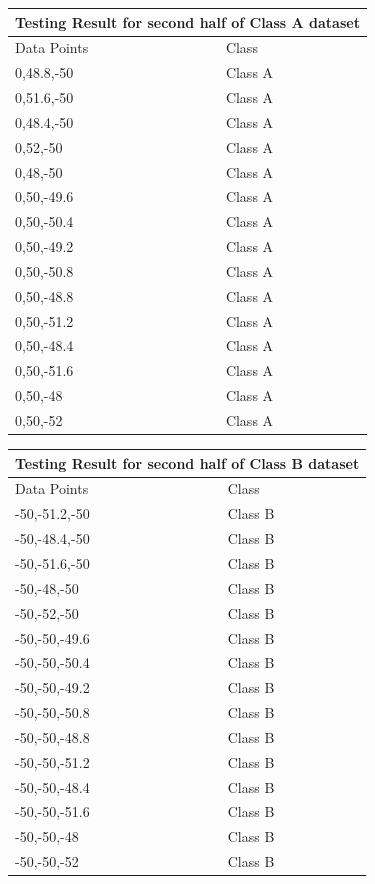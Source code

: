 \documentclass[letterpaper]{article}
\begin{document}
 \begin{tabular}{ |p{5cm}||p{5cm}| }
 \hline
 \multicolumn{2}{|c|}{Testing Result for second half of Class A dataset} \\
 \hline
Data Points& Class\\
 \hline
0,48.8,-50 & Class A \\
0,51.6,-50 & Class A \\
0,48.4,-50 & Class A \\
0,52,-50 & Class A \\
0,48,-50 & Class A \\
0,50,-49.6 & Class A \\
0,50,-50.4 & Class A \\
0,50,-49.2 & Class A \\
0,50,-50.8 & Class A \\
0,50,-48.8 & Class A \\
0,50,-51.2 & Class A \\
0,50,-48.4 & Class A \\
0,50,-51.6 & Class A \\
0,50,-48 & Class A \\
0,50,-52 & Class A \\
 
 \hline

\end {tabular}

 \begin{tabular}{ |p{5cm}||p{5cm}| }
 \hline
 \multicolumn{2}{|c|}{Testing Result for second half of Class B dataset} \\
 \hline
Data Points& Class\\
 \hline
-50,-51.2,-50 & Class B \\
-50,-48.4,-50 & Class B \\
-50,-51.6,-50 & Class B \\
-50,-48,-50 & Class B \\
-50,-52,-50 & Class B \\
-50,-50,-49.6 & Class B \\
-50,-50,-50.4 & Class B \\
-50,-50,-49.2 & Class B \\
-50,-50,-50.8 & Class B \\
-50,-50,-48.8 & Class B \\
-50,-50,-51.2 & Class B \\
-50,-50,-48.4 & Class B \\
-50,-50,-51.6 & Class B \\
-50,-50,-48 & Class B \\
-50,-50,-52 & Class B \\
 \hline

\end {tabular}
\end{document}
